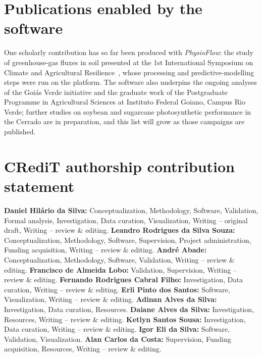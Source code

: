 \documentclass[11pt, letterpaper]{article}
\begin{document}
\section{Publications enabled by the software}\label{sec:enabled}

One scholarly contribution has so far been produced with \emph{PhysioFlow}: the study of greenhouse-gas fluxes in soil presented at the 1st International Symposium on Climate and Agricultural Resilience~\cite{DaSilva2026Goias}, whose processing and predictive-modelling steps were run on the platform. The software also underpins the ongoing analyses of the Goi\'as Verde initiative and the graduate work of the Postgraduate Programme in Agricultural Sciences at Instituto Federal Goiano, Campus Rio Verde; further studies on soybean and sugarcane photosynthetic performance in the Cerrado are in preparation, and this list will grow as those campaigns are published.

\section*{CRediT authorship contribution statement}
\textbf{Daniel Hil\'ario da Silva:} Conceptualization, Methodology, Software, Validation, Formal analysis, Investigation, Data curation, Visualization, Writing -- original draft, Writing -- review \& editing. \textbf{Leandro Rodrigues da Silva Souza:} Conceptualization, Methodology, Software, Supervision, Project administration, Funding acquisition, Writing -- review \& editing. \textbf{Andr\'e Abade:} Conceptualization, Methodology, Software, Validation, Writing -- review \& editing. \textbf{Francisco de Almeida Lobo:} Validation, Supervision, Writing -- review \& editing. \textbf{Fernando Rodrigues Cabral Filho:} Investigation, Data curation, Writing -- review \& editing. \textbf{Erli Pinto dos Santos:} Software, Visualization, Writing -- review \& editing. \textbf{Adinan Alves da Silva:} Investigation, Data curation, Resources. \textbf{Daiane Alves da Silva:} Investigation, Resources, Writing -- review \& editing. \textbf{Ketlyn Santos Sousa:} Investigation, Data curation, Writing -- review \& editing. \textbf{Igor Eli da Silva:} Software, Validation, Visualization. \textbf{Alan Carlos da Costa:} Supervision, Funding acquisition, Resources, Writing -- review \& editing.

\end{document}
